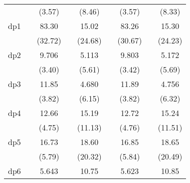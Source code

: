 {\begin{tabular}{l*{8}{c}}
            &                     &      (3.57)         &                     &      (8.46)         &                     &      (3.57)         &                     &      (8.33)         \\
[1em]
dp1         &                     &       83.30\sym{***}&                     &       15.02\sym{***}&                     &       83.26\sym{***}&                     &       15.30\sym{***}\\
            &                     &     (32.72)         &                     &     (24.68)         &                     &     (30.67)         &                     &     (24.23)         \\
[1em]
dp2         &                     &       9.706\sym{***}&                     &       5.113\sym{***}&                     &       9.803\sym{***}&                     &       5.172\sym{***}\\
            &                     &      (3.40)         &                     &      (5.61)         &                     &      (3.42)         &                     &      (5.69)         \\
[1em]
dp3         &                     &       11.85\sym{***}&                     &       4.680\sym{***}&                     &       11.89\sym{***}&                     &       4.756\sym{***}\\
            &                     &      (3.82)         &                     &      (6.15)         &                     &      (3.82)         &                     &      (6.32)         \\
[1em]
dp4         &                     &       12.66\sym{***}&                     &       15.19\sym{***}&                     &       12.72\sym{***}&                     &       15.24\sym{***}\\
            &                     &      (4.75)         &                     &     (11.13)         &                     &      (4.76)         &                     &     (11.51)         \\
[1em]
dp5         &                     &       16.73\sym{***}&                     &       18.60\sym{***}&                     &       16.85\sym{***}&                     &       18.65\sym{***}\\
            &                     &      (5.79)         &                     &     (20.32)         &                     &      (5.84)         &                     &     (20.49)         \\
[1em]
dp6         &                     &       5.643\sym{*}  &                     &       10.75\sym{***}&                     &       5.623\sym{*}  &                     &       10.85\sym{***}\\

\end{tabular}}
